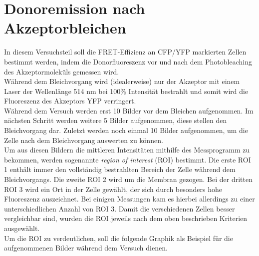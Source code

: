 \section{Donoremission nach Akzeptorbleichen}
In diesem Versuchsteil soll die FRET-Effizienz an CFP/YFP markierten Zellen bestimmt werden, indem 
die Donorfluoreszenz vor und nach dem Photobleaching des Akzeptormoleküls gemessen wird. \\
Während dem Bleichvorgang wird (idealerweise) nur der Akzeptor mit einem Laser der Wellenlänge 514 nm bei 
100\% Intensität bestrahlt und somit wird die Fluoreszenz des Akzeptors YFP verringert. \\
Während dem Versuch werden erst 10 Bilder vor dem Bleichen aufgenommen. Im nächsten Schritt
werden weitere 5 Bilder aufgenommen, diese stellen den Bleichvorgang dar. Zuletzt werden noch einmal 10 Bilder aufgenommen, 
um die Zelle nach dem Bleichvorgang auswerten zu können.\\
Um aus diesen Bildern die mittleren Intensitäten mithilfe des Messprogramm zu bekommen, werden sogenannte \textit{region of interest} (ROI) bestimmt. 
Die erste ROI 1 enthält immer den vollständig bestrahlten Bereich der Zelle während dem Bleichvorgangs. 
Die zweite ROI 2 wird um die Membran gezogen. 
Bei der dritten ROI 3 wird ein Ort in der Zelle gewählt, der sich durch besonders hohe Fluoreszenz auszeichnet. Bei einigen  
Messungen kam es hierbei allerdings zu einer unterschiedlichen Anzahl von ROI 3. Damit die 
verschiedenen Zellen besser vergleichbar sind,
wurden die ROI jeweils nach dem oben beschrieben Kriterien ausgewählt.\\
Um die ROI zu verdeutlichen, soll die folgende Graphik als Beispiel für die aufgenommenen Bilder
während dem Versuch dienen.\\
